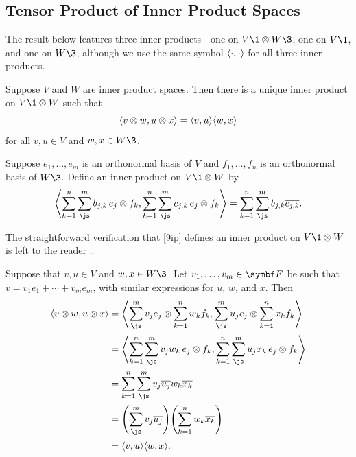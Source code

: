 \subsection{Tensor Product of Inner Product Spaces}

The result below features three inner products---one on $V\1 \tensor W\3$, one on $V\1$, and one on $W\3$, although we use the same symbol $\langle \cdot, \cdot \rangle$ for all three inner products.

{Suppose $V$ and $W$ are inner product spaces. Then there is a unique inner product on $V\1 \tensor W$ such that
\[
\langle v \otimes w, u \otimes x \rangle = \langle v, u\rangle \langle w, x\rangle
\]
for all $v, u \in V$ and $w, x \in W\3$.}

\proof
Suppose $e_1, \ldots, e_m$ is an orthonormal basis of $V$ and $f_1, \ldots, f_n$ is an orthonormal basis of $W\3$.
Define an inner product on $V\1 \tensor W$ by
\vspace{-.03in} %
\begin{equation} \label{9ip}
\ip[\Bigg]{ \sum_{k=1}^n \sum_{\js}^m b_{j,k} \, e_j \tensor f_k, \sum_{k=1}^n \sum_{\js}^m c_{j,k} \, e_j \tensor f_k}
= \sum_{k=1}^n \sum_{\js}^m b_{j,k} \overline{ c_{j,k} }.
\vspace{-.03in} %
\end{equation}%

The straightforward verification that \ref{9ip} defines an inner product on $V\1 \tensor W$ is left to the reader .

Suppose that $v, u \in V$ and $w, x \in W\3$. Let $v_1, \ldots, v_m \in \F{}$ be such that
\mbox{$v = v_1 e_1 + \cdots + v_m e_m$}, with similar expressions for $u$, $w$, and $x$. Then
\begin{align*}
\ip{ v \tensor w, u \tensor x }
&= \ip[\Bigg]{\sum_{\js}^m v_j e_j \tensor \sum_{k=1}^n w_k f_k , \sum_{\js}^m u_j e_j \tensor \sum_{k=1}^n x_k f_k} \\[1bp]
&= \ip[\Bigg]{\sum_{k=1}^n \sum_{\js}^m v_j w_k \, e_j \tensor f_k , \sum_{k=1}^n \sum_{\js}^m u_j x_k \, e_j \tensor f_k} \\[1bp]
&= \sum_{k=1}^n \sum_{\js}^m v_j\overline{u_j} w_k \overline{x_k} \\[1bp]
&= \paren[\Bigg]{ \sum_{\js}^m v_j \overline{u_j} } \paren[\Bigg]{ \sum_{k=1}^n w_k \overline{x_k} } \\[1bp]
&= \ip{v, u} \ip{w, x}.
\end{align*}

